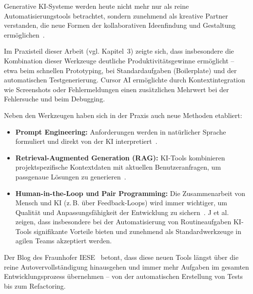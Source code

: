 Generative KI-Systeme werden heute nicht mehr nur als reine
Automatisierungstools betrachtet, sondern zunehmend als kreative Partner
verstanden, die neue Formen der kollaborativen Ideenfindung und Gestaltung
ermöglichen~\cite{khan_beyond_2025}.

Im Praxisteil dieser Arbeit (vgl. Kapitel~3) zeigte sich, dass insbesondere die
Kombination dieser Werkzeuge deutliche Produktivitätsgewinne ermöglicht – etwa
beim schnellen Prototyping, bei Standardaufgaben (Boilerplate) und der
automatischen Testgenerierung. Cursor AI ermöglichte durch Kontextintegration
wie Screenshots oder Fehlermeldungen einen zusätzlichen Mehrwert bei der
Fehlersuche und beim Debugging.

Neben den Werkzeugen haben sich in der Praxis auch neue Methoden etabliert:
\begin{itemize}
    \item \textbf{Prompt Engineering:} Anforderungen werden in natürlicher Sprache formuliert und direkt von der KI interpretiert~\cite{esposito_generative_2025}.
    \item \textbf{Retrieval-Augmented Generation (RAG):} KI-Tools kombinieren projektspezifische Kontextdaten mit aktuellen Benutzeranfragen, um passgenaue Lösungen zu generieren~\cite{esposito_generative_2025}.
    \item \textbf{Human-in-the-Loop und Pair Programming:} Die Zusammenarbeit von Mensch und KI (z.\,B. über Feedback-Loops) wird immer wichtiger, um Qualität und Anpassungsfähigkeit der Entwicklung zu sichern~\cite{nguyen-duc_generative_2023,siebert_generative_2024}. J et al.~\cite{j_integration_2023} zeigen, dass insbesondere bei der Automatisierung von Routineaufgaben KI-Tools signifikante Vorteile bieten und zunehmend als Standardwerkzeuge in agilen Teams akzeptiert werden.
\end{itemize}

Der Blog des Fraunhofer IESE~\cite{siebert_generative_2024} betont, dass diese
neuen Tools längst über die reine Autovervollständigung hinausgehen und immer
mehr Aufgaben im gesamten Entwicklungsprozess übernehmen – von der
automatischen Erstellung von Tests bis zum Refactoring.
